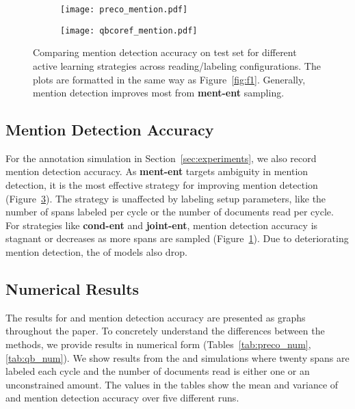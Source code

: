 \begin{figure}[!t]
    \centering
    \begin{subfigure}[!t]{\linewidth}
        \centering
        \texttt{[image: preco\_mention.pdf]}
        \caption{\preco{}}
        \label{fig:preco_ment}
    \end{subfigure}
    \begin{subfigure}[!t]{\linewidth}
        \centering
        \texttt{[image: qbcoref\_mention.pdf]}
        \caption{\qbcoref{}}
        \label{fig:qbcoref_ment}
    \end{subfigure}
    \caption{Comparing mention detection accuracy on test set for different active learning strategies across reading/labeling
    configurations. The plots are formatted in the same way as Figure~\ref{fig:f1}.
    Generally, mention detection improves most from \textbf{ment-ent} sampling.}
    \label{fig:detection}
\end{figure}


\subsection{Mention Detection Accuracy}
\label{ssec:detection}

For the annotation simulation in Section~\ref{sec:experiments}, we also record
mention detection accuracy. As \textbf{ment-ent} targets ambiguity in mention
detection, it is the most effective strategy for improving mention detection
(Figure~\ref{fig:detection}). The strategy is unaffected by labeling setup
parameters, like the number of spans labeled per cycle or the number of
documents read per cycle. For strategies like \textbf{cond-ent} and
\textbf{joint-ent}, mention detection accuracy is stagnant or decreases as more
spans are sampled (Figure~\ref{fig:preco_ment}).  Due to deteriorating mention detection, the \avgfone{} of
models also drop.

\subsection{Numerical Results}
\label{ssec:num}
The results for \avgfone{} and mention detection accuracy are presented as
graphs throughout the paper. To concretely understand the differences between
the methods, we provide
results in numerical form (Tables~\ref{tab:preco_num},\ref{tab:qb_num}). We show
results from the \preco{} and \qbcoref{} simulations where twenty spans are labeled each
cycle and the number of documents read is either one or an unconstrained amount. The values in the tables show the mean and variance of \avgfone{} and mention detection accuracy over five different runs.

